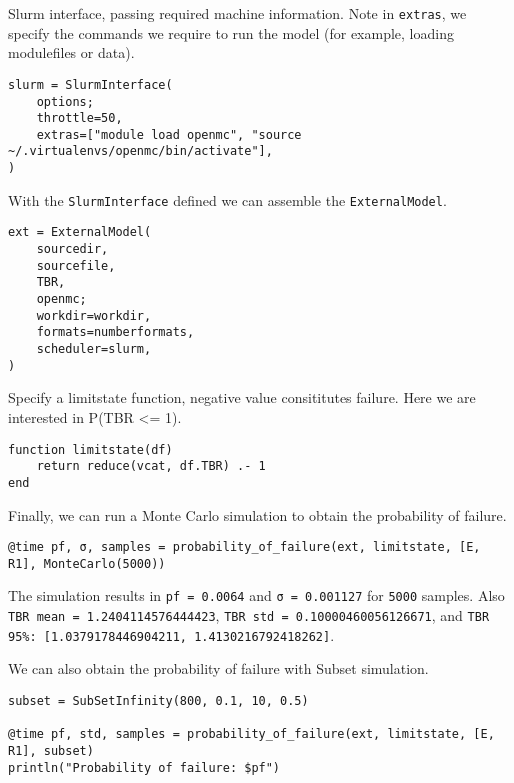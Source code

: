 Slurm interface, passing required machine information. Note in \texttt{extras}, we specify the commands we require to run the model (for example, loading modulefiles or data).




\begin{verbatim}
slurm = SlurmInterface(
    options;
    throttle=50,
    extras=["module load openmc", "source ~/.virtualenvs/openmc/bin/activate"],
)
\end{verbatim}



With the \texttt{SlurmInterface} defined we can assemble the \texttt{ExternalModel}.




\begin{verbatim}
ext = ExternalModel(
    sourcedir,
    sourcefile,
    TBR,
    openmc;
    workdir=workdir,
    formats=numberformats,
    scheduler=slurm,
)
\end{verbatim}



Specify a limitstate function, negative value consititutes failure. Here we are interested in P(TBR <= 1).




\begin{verbatim}
function limitstate(df)
    return reduce(vcat, df.TBR) .- 1
end
\end{verbatim}



Finally, we can run a Monte Carlo simulation to obtain the probability of failure.




\begin{verbatim}
@time pf, σ, samples = probability_of_failure(ext, limitstate, [E, R1], MonteCarlo(5000))
\end{verbatim}



The simulation results in \texttt{pf = 0.0064} and \texttt{σ = 0.001127} for \texttt{5000} samples. Also \texttt{TBR mean = 1.2404114576444423}, \texttt{TBR std = 0.10000460056126671}, and \texttt{TBR 95\%: [1.0379178446904211, 1.4130216792418262]}.



We can also obtain the probability of failure with Subset simulation.




\begin{verbatim}
subset = SubSetInfinity(800, 0.1, 10, 0.5)

@time pf, std, samples = probability_of_failure(ext, limitstate, [E, R1], subset)
println("Probability of failure: $pf")
\end{verbatim}



